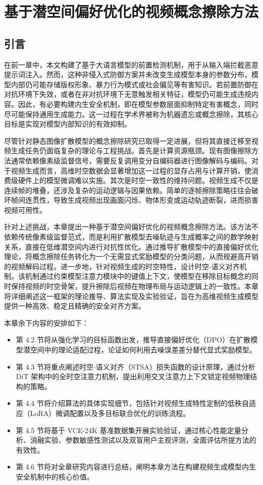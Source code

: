 \chapter{基于潜空间偏好优化的视频概念擦除方法}\label{chap:concept}

\section{引言}\label{sec:introduction}

在前一章中，本文构建了基于大语言模型的前置检测机制，用于从输入端拦截恶意提示词注入。然而，这种非侵入式防御方案并未改变生成模型本身的参数分布，模型内部仍可能存储版权形象、暴力行为模式或社会偏见等有害知识。若前置防御在对抗环境下失效，或者在非对抗环境下无意触发相关特征，模型仍可能生成违规内容。因此，有必要构建内生安全机制，即在模型参数层面抑制特定有害概念，同时尽可能保持通用生成能力。这一过程在学术界被称为机器遗忘或概念擦除，其核心目标是实现对模型内部知识的有效抑制。

尽管针对静态图像扩散模型的概念擦除研究已取得一定进展，但将其直接迁移至视频生成任务仍面临复杂的理论与工程挑战。首先是计算资源瓶颈。现有图像擦除方法通常依赖像素级监督信号，需要反复调用变分自编码器进行图像解码与编码。对于视频生成而言，高维时空数据会显著增加这一过程的显存占用与计算开销，使消费级硬件上的模型微调难以实施。其次是时空一致性的维持问题。视频生成不仅是连续帧的堆叠，还涉及复杂的运动逻辑与因果依赖。简单的逐帧擦除策略往往会破坏帧间连贯性，导致生成视频出现画面闪烁、物体形变或运动轨迹断裂，进而损害视频可用性。

针对上述挑战，本章提出一种基于潜空间偏好优化的视频概念擦除方法。该方法不依赖传统像素级监督范式，而是利用扩散模型去噪轨迹与生成概率之间的数学映射关系，直接在低维潜空间内进行对抗性优化。通过推导扩散模型中的直接偏好优化理论，将概念擦除任务转化为一个无需显式奖励模型的分类问题，从而规避高开销的视频解码过程。进一步地，针对视频生成的时空特性，设计时空-语义对齐机制。该机制通过约束模型注意力模块中的键值上下文，使模型在移除目标概念的同时保持视频的时空骨架，提升擦除后视频在物理布局与运动逻辑上的一致性。本章将详细阐述这一框架的理论推导、算法实现及实验验证，旨在为高维视频生成模型提供一种高效、稳定且精确的安全对齐方案。

本章余下内容的安排如下：
\begin{itemize}
    \item 第 4.2 节将从强化学习的目标函数出发，推导直接偏好优化（DPO）在扩散模型潜空间中的理论适配过程，论证如何利用去噪误差差分替代显式奖励模型。
    \item 第 4.3 节将重点阐述时空-语义对齐（STSA）损失函数的设计原理，通过分析 DiT 架构中的全时空注意力机制，提出利用交叉注意力上下文锁定视频物理结构的策略。
    \item 第 4.4 节将介绍算法的具体实现细节，包括针对视频生成特性定制的低秩自适应（LoRA）微调配置以及多目标联合优化的训练流程。
    \item 第 4.5 节将基于 VCE-24K 基准数据集开展实验验证，通过核心性能定量分析、消融实验、参数敏感性测试以及双盲用户主观评测，全面评估所提方法的有效性。
    \item 第 4.6 节将对全章研究内容进行总结，阐明本章方法在构建视频生成模型内生安全机制中的核心价值。
\end{itemize}

